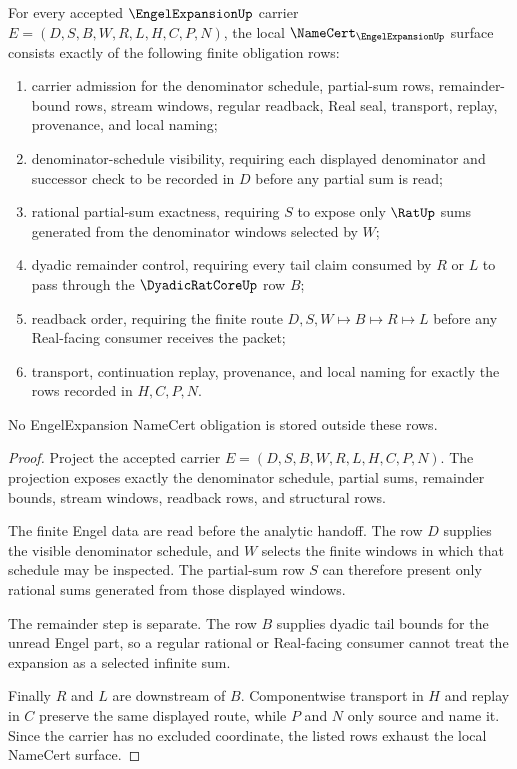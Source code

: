 \begin{theorem}
\label{thm:engel-expansion-namecert-obligations}
For every accepted $\EngelExpansionUp$ carrier $E=(D,S,B,W,R,L,H,C,P,N)$, the local $\NameCert_{\EngelExpansionUp}$ surface consists exactly of the following finite obligation rows:
\begin{enumerate}
\item carrier admission for the denominator schedule, partial-sum rows, remainder-bound rows, stream windows, regular readback, Real seal, transport, replay, provenance, and local naming;
\item denominator-schedule visibility, requiring each displayed denominator and successor check to be recorded in $D$ before any partial sum is read;
\item rational partial-sum exactness, requiring $S$ to expose only $\RatUp$ sums generated from the denominator windows selected by $W$;
\item dyadic remainder control, requiring every tail claim consumed by $R$ or $L$ to pass through the $\DyadicRatCoreUp$ row $B$;
\item readback order, requiring the finite route $D,S,W \longmapsto B \longmapsto R \longmapsto L$ before any Real-facing consumer receives the packet;
\item transport, continuation replay, provenance, and local naming for exactly the rows recorded in $H,C,P,N$.
\end{enumerate}
No EngelExpansion NameCert obligation is stored outside these rows.
\end{theorem}
\begin{proof}
Project the accepted carrier $E=(D,S,B,W,R,L,H,C,P,N)$. The projection exposes exactly the denominator schedule, partial sums, remainder bounds, stream windows, readback rows, and structural rows.

The finite Engel data are read before the analytic handoff. The row $D$ supplies the visible denominator schedule, and $W$ selects the finite windows in which that schedule may be inspected. The partial-sum row $S$ can therefore present only rational sums generated from those displayed windows.

The remainder step is separate. The row $B$ supplies dyadic tail bounds for the unread Engel part, so a regular rational or Real-facing consumer cannot treat the expansion as a selected infinite sum.

Finally $R$ and $L$ are downstream of $B$. Componentwise transport in $H$ and replay in $C$ preserve the same displayed route, while $P$ and $N$ only source and name it. Since the carrier has no excluded coordinate, the listed rows exhaust the local NameCert surface.
\end{proof}

